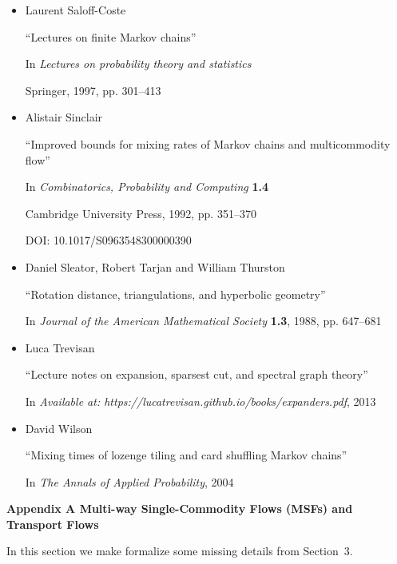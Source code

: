 \begin{itemize}
\item[] [Sal97]
Laurent Saloff-Coste

“Lectures on finite Markov chains”

In \emph{Lectures on probability theory and statistics}

Springer, 1997, pp. 301–413


      

\item[] [Sin92]
Alistair Sinclair

“Improved bounds for mixing rates of Markov chains and multicommodity flow”

In \emph{Combinatorics, Probability and Computing} \textbf{1.4}

Cambridge University Press, 1992, pp. 351–370

DOI: 10.1017/S0963548300000390


      

\item[] [STT88]
Daniel Sleator, Robert Tarjan and William Thurston

“Rotation distance, triangulations, and hyperbolic geometry”

In \emph{Journal of the American Mathematical Society} \textbf{1.3}, 1988, pp. 647–681


      

\item[] [Tre13]
Luca Trevisan

“Lecture notes on expansion, sparsest cut, and spectral graph theory”

In \emph{Available at: https://lucatrevisan.github.io/books/expanders.pdf}, 2013


      

\item[] [Wil04]
David Wilson

“Mixing times of lozenge tiling and card shuffling Markov chains”

In \emph{The Annals of Applied Probability}, 2004


    

\end{itemize}




\par\medskip\noindent\textbf{Appendix A Multi-way Single-Commodity Flows (MSFs) and Transport Flows}\par




In this section we make formalize some missing details from Section 3.\par




